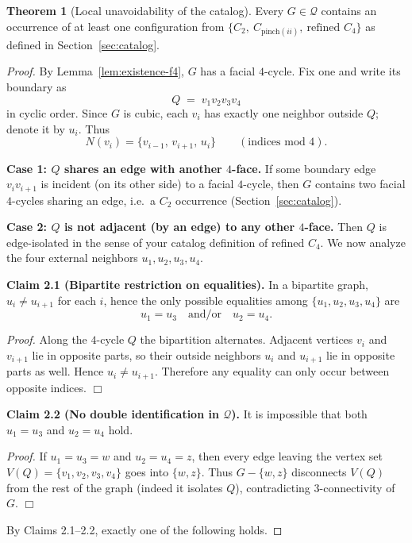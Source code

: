 \documentclass[12pt]{article}
\theoremstyle{definition}
\newtheorem{theorem}{Theorem}
\begin{document}
\begin{theorem}[Local unavoidability of the catalog]
\label{thm:completeness}
Every $G\in\mathcal Q$ contains an occurrence of at least one configuration
from $\{C_2,\ C_{\mathrm{pinch}(ii)},\ \text{refined }C_4\}$ as defined in
Section~\ref{sec:catalog}.
\end{theorem}

\begin{proof}
By Lemma~\ref{lem:existence-f4}, $G$ has a facial $4$-cycle. Fix one and write its boundary as
\[
Q \;=\; v_1v_2v_3v_4
\]
in cyclic order.
Since $G$ is cubic, each $v_i$ has exactly one neighbor outside $Q$; denote it by $u_i$.
Thus
\[
N(v_i)=\{v_{i-1},\,v_{i+1},\,u_i\}\qquad (\text{indices mod }4).
\]

\medskip
\noindent\textbf{Case 1: $Q$ shares an edge with another $4$-face.}
If some boundary edge $v_iv_{i+1}$ is incident (on its other side) to a facial $4$-cycle,
then $G$ contains two facial $4$-cycles sharing an edge, i.e.\ a $C_2$ occurrence
(Section~\ref{sec:catalog}).

\medskip
\noindent\textbf{Case 2: $Q$ is not adjacent (by an edge) to any other $4$-face.}
Then $Q$ is edge-isolated in the sense of your catalog definition of refined $C_4$.
We now analyze the four external neighbors $u_1,u_2,u_3,u_4$.

\medskip
\noindent\textbf{Claim 2.1 (Bipartite restriction on equalities).}
In a bipartite graph, $u_i\neq u_{i+1}$ for each $i$, hence the only possible equalities among
$\{u_1,u_2,u_3,u_4\}$ are
\[
u_1=u_3 \quad\text{and/or}\quad u_2=u_4.
\]

\smallskip
\noindent\emph{Proof.}
Along the $4$-cycle $Q$ the bipartition alternates. Adjacent vertices $v_i$ and $v_{i+1}$
lie in opposite parts, so their outside neighbors $u_i$ and $u_{i+1}$ lie in opposite parts as well.
Hence $u_i\neq u_{i+1}$. Therefore any equality can only occur between opposite indices.
\hfill$\Box$

\medskip
\noindent\textbf{Claim 2.2 (No double identification in $\mathcal Q$).}
It is impossible that both $u_1=u_3$ and $u_2=u_4$ hold.

\smallskip
\noindent\emph{Proof.}
If $u_1=u_3=w$ and $u_2=u_4=z$, then every edge leaving the vertex set
$V(Q)=\{v_1,v_2,v_3,v_4\}$ goes into $\{w,z\}$.
Thus $G-\{w,z\}$ disconnects $V(Q)$ from the rest of the graph (indeed it isolates $Q$),
contradicting $3$-connectivity of $G$.
\hfill$\Box$

\medskip
\noindent
By Claims 2.1--2.2, exactly one of the following holds.


\end{proof}
\end{document}
